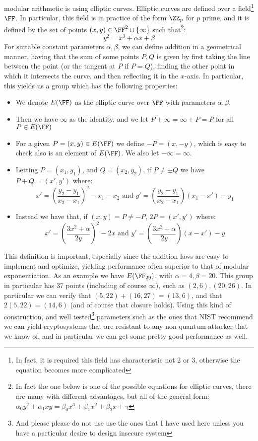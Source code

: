\documentclass{article}
\begin{document}
modular arithmetic is using elliptic curves. Elliptic curves are defined over a field\footnote{In fact, it is required this 
field has characteristic not 2 or 3, otherwise the equation becomes more complicated} $\FF$. In particular,
this field is in practice of the form $\ZZ_p$ for $p$ prime, and it is defined by the set of points $(x, y) \in \FF^2 \cup \{ \infty \}$ such that\footnote{In fact the one below is
one of the possible equations for elliptic curves, there are many with different advantages, but all of the general form: $\alpha_0 y^2 + \alpha_1 xy = \beta_0 x^3 + \beta_1 x^2 + \beta_2 x + \gamma$}:
\[ y^2 = x^3 + \alpha x + \beta \]
For suitable constant parameters $\alpha, \beta$, we can define addition in a geometrical manner, having that the sum of some 
points $P, Q$ is given by first taking the line between the point (or the tangent at $P$ if $P = Q$), finding the other point in which 
it intersects the curve, and then reflecting it in the $x$-axis. In particular, this yields us a group which has the following properties:
\begin{itemize}
    \item We denote $E(\FF)$ as the elliptic curve over $\FF$ with parameters $\alpha, \beta$.
    \item Then we have $\infty$ as the identity, and we let $P + \infty = \infty + P = P$ for all $P \in E(\FF)$
    \item For a given $P = (x, y) \in E(\FF)$ we define $-P = (x, -y)$, which is easy to check also is an element of $E(\FF)$. We also let $-\infty = \infty$.
    \item Letting $P = (x_1, y_1)$, and $Q = (x_2, y_2)$, if $P \neq \pm Q$ we have $P + Q = (x', y')$ where:
          \[ x' = \left(\frac{y_2 - y_1}{x_2 - x_1}\right)^2 - x_1 - x_2 \text{ and } y' = \left(\frac{y_2 - y_1}{x_2 - x_1}\right)(x_1 - x') - y_1  \]
    \item Instead we have that, if $(x, y) = P \neq -P$, $2P = (x', y')$ where:
          \[ x' = \left(\frac{3x^2 + \alpha}{2y}\right)^2 - 2x \text{ and } y' = \left(\frac{3x^2 + \alpha}{2y}\right)(x - x') - y  \]
\end{itemize}
This definition is important, especially since the addition laws are easy to implement and optimize, yielding performance 
often superior to that of modular exponentiation. As an example we have $E(\FF_{29})$, with $\alpha=4, \beta=20$.
This group in particular has 37 points (including of course $\infty$), such as $(2,6), (20, 26)$. In particular we can 
verify that $(5, 22) + (16, 27) = (13, 6)$, and that $2(5, 22) = (14, 6)$ (and of course that closure holds).
Using this kind of construction, and well tested\footnote{And please please do not use use the ones that I have used here unless you have a particular desire to design insecure system}
parameters such as the ones that NIST recommend \cite{barkerRecommendationPairWiseKeyEstablishment2018}
we can yield cryptosystems that are resistant to any non quantum attacker that we know of, and in particular we can get some pretty good performance as well.
\end{document}
